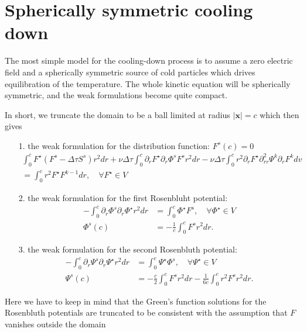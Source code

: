 \documentclass[preprint]{revtex4}
\begin{document}
\section{Spherically symmetric cooling down}
The most simple model for the cooling-down process is to assume a zero electric field and a spherically symmetric source of cold particles which drives equilibration of the temperature. The whole kinetic equation will be spherically symmetric, and the weak formulations become quite compact. 

In short, we truncate the domain to be a ball limited at radius $\mid\bm{x}\mid = c$ which then gives
\begin{itemize}
\item[1.] the weak formulation for the distribution function: $F^s(c)=0$
\begin{multline}
\int_0^cF^{\star}(F^s-\Delta\tau S^s)r^2dr+\nu\Delta\tau\int_0^c\partial_rF^{\star}\partial_r\Phi^s F^sr^2dr-\nu\Delta\tau\int_0^cr^2\partial_rF^{\star}\partial^2_{rr}\Psi^k\partial_rF^kdv
\\=\int_0^cr^2F^{\star}F^{k-1}dr, \quad \forall F^{\star}\in V
\end{multline}
\item[2.] the weak formulation for the first Rosenbluht potential:
\begin{align}
-\int_0^c\partial_r\Phi^s\partial_r\Phi^{\star}r^2dr&=\int_0^c\Phi^{\star}F^s, \quad \forall \Phi^{\star}\in V\\
\Phi^s(c)&=-\frac{1}{c}\int_0^c F^sr^2 dr.
\end{align}
\item[3.] the weak formulation for the second Rosenbluth potential:
\begin{align}
-\int_0^c\partial_r\Psi^s\partial_r\Psi^{\star}r^2dr&=\int_0^c\Psi^{\star}\Phi^s, \quad \forall \Psi^{\star}\in V\\
\Psi^s(c)&=-\frac{c}{2}\int_0^c  F^s r^2dr-\frac{1}{6c}\int_0^c r^2 F^s r^2dr.
\end{align}
\end{itemize}
Here we have to keep in mind that the Green's function solutions for the Rosenbluth potentials are truncated to be consistent with the assumption that $F$ vanishes outside the domain 
\end{document}
